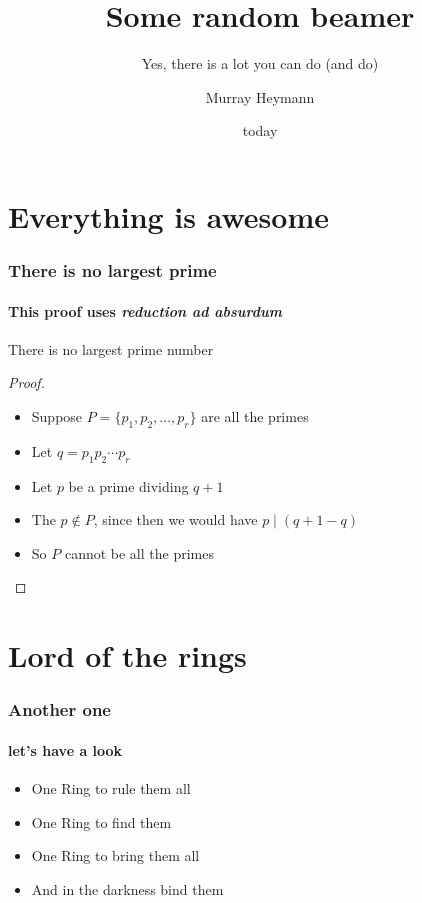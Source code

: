 \documentclass{beamer}
\title{Some random beamer}
\subtitle{Yes, there is a lot you can do (and do)}
\author{Murray Heymann}
\institute{University of Stellenbosch}
\date{today}
\begin{document}
\section{Everything is awesome}

\begin{frame}
	\titlepage
\end{frame}

\begin{frame}
	\frametitle{There is no largest prime}
	\framesubtitle{This proof uses \emph{reduction ad absurdum}}

	\begin{theorem}
		There is no largest prime number
	\end{theorem}


	\begin{proof}
		\begin{itemize}
			\item<1->
				Suppose $P = \{p_{1}, p_{2}, \dotsc, p_{r}\}$ are all the
				primes
			\item<2-3>
				Let $q = p_{1} p_{2} \dotsb p_{r}$
			\item<3> Let $p$ be a prime dividing $q+1$
			\item<4-> The $p \not \in P$, since then we would have $p \mid (q + 1 - q)$
			\item<1-> So $P$ cannot be all the primes
		\end{itemize}
	\end{proof}
\end{frame}

\section{Lord of the rings}

\begin{frame}
	\frametitle{Another one}
	\framesubtitle{let's have a look}


	\begin{itemize}
		\item
			One Ring to rule them all
		\item
			One Ring to find them
		\item
			One Ring to bring them all
		\item
			And in the darkness bind them
	\end{itemize}
\end{frame}
\end{document}
